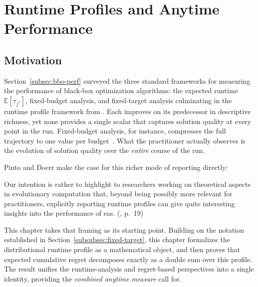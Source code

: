 \chapter{Runtime Profiles and Anytime Performance}
\label{cha:profiles}

\section{Motivation}

Section~\ref{subsec:bbo-perf} surveyed the three standard frameworks
for measuring
the performance of black-box optimization algorithms: the expected runtime
$\mathbb{E}[\tau_{f^*}]$, fixed-budget analysis, and fixed-target
analysis culminating
in the runtime profile framework from \cite{pinto2018practice}. Each
improves on its predecessor in descriptive richness, yet none
provides a single scalar
that captures solution quality at every point in the run.
Fixed-budget analysis, for
instance, compresses the full trajectory to one value per
budget~\cite{jansen2014fixed}.
What the practitioner actually observes is the evolution of solution
quality over the
\emph{entire} course of the run.

Pinto and Doerr make the case for this richer mode of reporting directly:
\begin{displayquote}
  Our intention is rather to highlight to researchers working on
  theoretical aspects in
  evolutionary computation that, beyond being possibly more relevant
  for practitioners,
  explicitly reporting runtime profiles can give quite interesting
  insights into the
  performance of \acrshort{ea}s.
  {(\cite{pinto2018practice}, p.~19)}
\end{displayquote}

This chapter takes that framing as its starting point. Building on
the notation established in Section~\ref{subsubsec:fixed-target},
this chapter formalizes the distributional runtime profile as a mathematical
object, and then proves that expected cumulative regret decomposes exactly as a
double sum over this profile. The result unifies the runtime-analysis and
regret-based perspectives into a single identity, providing the
\emph{combined anytime measure} \citet{pinto2018practice} call for.



